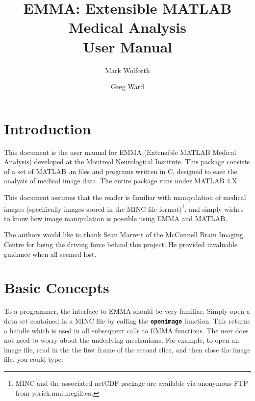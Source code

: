 
\title{EMMA: Extensible MATLAB Medical Analysis \\ User Manual}

\author{Mark Wolforth \and Greg Ward}

\def\code#1{{\tt \bf #1}}

 

\maketitle
\newpage

\tableofcontents

\newpage
\section{Introduction}


This document is the user manual for EMMA (Extensible MATLAB Medical
Analysis) developed at the Montreal Neurological Institute.  This
package consists of a set of MATLAB .m files and programs written in
C, designed to ease the analysis of medical image data.  The entire
package runs under MATLAB 4.X.

This document assumes that the reader is familiar with manipulation of
medical images (specifically images stored in the MINC file
format)\footnote{MINC and the associated netCDF package are available
via anonymous FTP from yorick.mni.mcgill.ca.}, and simply wishes to
know how image manipulation is possible using EMMA and MATLAB.

The authors would like to thank Sean Marrett of the McConnell Brain
Imaging Centre for being the driving force behind this project.  He
provided invaluable guidance when all seemed lost.

\newpage
\section{Basic Concepts}

To a programmer, the interface to EMMA should be very familiar.
Simply open a data set contained in a MINC file by calling the
\code{openimage} function.  This returns a handle which is used in all
subsequent calls to EMMA functions.  The user does not need to worry
about the underlying mechanisms.  For example, to open an image file,
read in the the first frame of the second slice, and then close the
image file, you could type:

